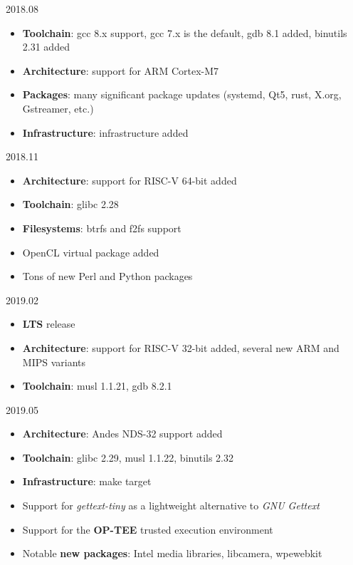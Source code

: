 \begin{frame}{2018.08}
  \begin{itemize}
  \item {\bf Toolchain}: gcc 8.x support, gcc 7.x is the default, gdb
    8.1 added, binutils 2.31 added
  \item {\bf Architecture}: support for ARM Cortex-M7
  \item {\bf Packages}: many significant package updates (systemd,
    Qt5, rust, X.org, Gstreamer, etc.)
  \item {\bf Infrastructure}:  infrastructure
    added
  \end{itemize}
\end{frame}

\begin{frame}{2018.11}
  \begin{itemize}
  \item {\bf Architecture}: support for RISC-V 64-bit added
  \item {\bf Toolchain}: glibc 2.28
  \item {\bf Filesystems}: btrfs and f2fs support
  \item OpenCL virtual package added
  \item Tons of new Perl and Python packages
  \end{itemize}
\end{frame}

\begin{frame}{2019.02}
  \begin{itemize}
  \item {\bf LTS} release
  \item {\bf Architecture}: support for RISC-V 32-bit added, several
    new ARM and MIPS variants
  \item {\bf Toolchain}: musl 1.1.21, gdb 8.2.1
  \end{itemize}
\end{frame}

\begin{frame}{2019.05}
  \begin{itemize}
  \item {\bf Architecture}: Andes NDS-32 support added
  \item {\bf Toolchain}: glibc 2.29, musl 1.1.22, binutils 2.32
  \item {\bf Infrastructure}:  make target
  \item Support for {\em gettext-tiny} as a lightweight alternative to
    {\em GNU Gettext}
  \item Support for the {\bf OP-TEE} trusted execution environment
  \item Notable {\bf new packages}: Intel media libraries, libcamera,
    wpewebkit
  \end{itemize}
\end{frame}


